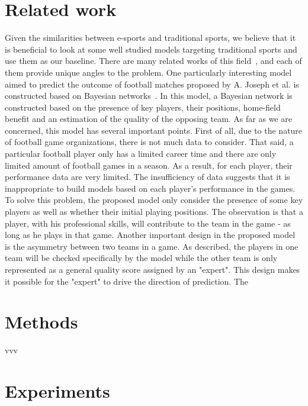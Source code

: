 \documentclass{article} %
\begin{document}
\section{Related work}
Given the similarities between e-sports and traditional sports, we believe that it is beneficial to look at some well studied models targeting traditional sports and use them as our baseline. There are many related works of this field~\cite{Joseph2006544}\cite{Min2008551}, and each of them provide unique angles to the problem. One particularly interesting model aimed to predict the outcome of football matches proposed by {A. Joseph et al.} is constructed based on Bayesian networks~\cite{Joseph2006544}. In this model, a Bayesian network is constructed based on the presence of key players, their positions, home-field benefit and an estimation of the quality of the opposing team. As far as we are concerned, this model has several important points. First of all, due to the nature of football game organizations, there is not much data to consider. That said, a particular football player only has a limited career time and there are only limited amount of football games in a season. As a result, for each player, their performance data are very limited. The insufficiency of data suggests that it is inappropriate to build models based on each player's performance in the games. To solve this problem, the proposed model only consider the presence of some key players as well as whether their initial playing positions. The observation is that a player, with his professional skills, will contribute to the team in the game - as long as he plays in that game. Another important design in the proposed model is the asymmetry between two teams in a game. As described, the players in one team will be checked specifically by the model while the other team is only represented as a general quality score assigned by an "expert". This design makes it possible for the "expert" to drive the direction of prediction. The 

\section{Methods}
vvv

\section{Experiments}
\end{document}
